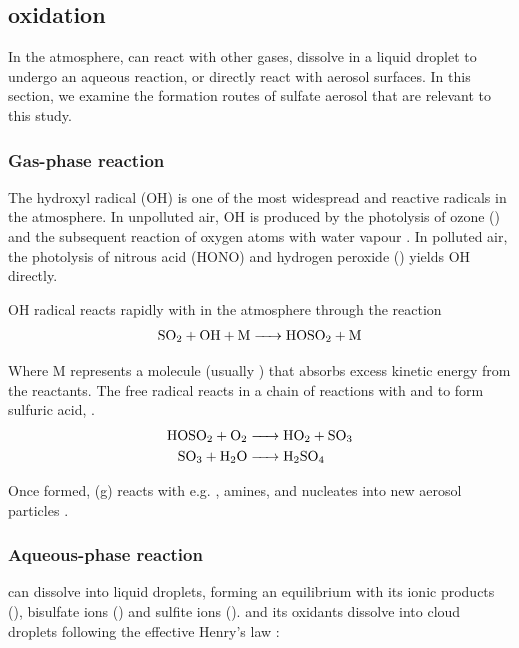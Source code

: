 \subsection{ oxidation}
In the atmosphere,  can react with other gases, dissolve in a liquid droplet to undergo an aqueous reaction, or directly react with aerosol surfaces. In this section, we examine the formation routes of sulfate aerosol that are relevant to this study. 

\subsubsection{Gas-phase reaction}

The hydroxyl radical (OH) is one of the most widespread and reactive radicals in the atmosphere. In unpolluted air, OH is produced by the photolysis of ozone () and the subsequent reaction of oxygen atoms with water vapour \citep{wayneChemistryAtmospheresIntroduction2006}. In polluted air, the photolysis of nitrous acid (HONO) and hydrogen peroxide () yields OH directly. 

OH radical reacts rapidly with  in the atmosphere through the reaction
\begin{align}
\ce{SO2 + OH + M -> HOSO2 + M}    
\end{align}

Where M represents a molecule (usually ) that absorbs excess kinetic energy from the reactants. The free radical  reacts in a chain of reactions with  and  to form sulfuric acid, .
\begin{align}
\ce{HOSO2 + O2 &-> HO2 + SO3}\\
\ce{SO3 + H2O &-> H2SO4}
\end{align}

Once formed,  (g) reacts with e.g. , amines,  and nucleates into new aerosol particles \citep{seinfeldAtmosphericChemistryPhysics2016}.

\subsubsection{Aqueous-phase reaction}

 can dissolve into liquid droplets, forming an equilibrium with its ionic products (), bisulfate ions () and sulfite ions ().  and its oxidants dissolve into cloud droplets following the effective Henry's law \citep{seinfeldAtmosphericChemistryPhysics2016}: 

